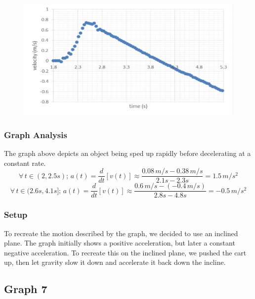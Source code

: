\documentclass[11pt, letterpaper, includehead]{article}
\begin{document}
  \begin{figure}[H] %
    \centering 
    \includegraphics[width=\linewidth]{graph_6.png}
  \end{figure}

  \subsubsection{Graph Analysis}
  The graph above depicts an object being sped up rapidly before decelerating
  at a constant rate.
  $$\forall \, t \in (2, 2.5s); \, a(t) = \frac{d}{dt}[v(t)] \approx \frac{0.08 \, m/s - 0.38 \, m/s}{2.1s - 2.3s} = 1.5 \, m/s^2$$
  $$\forall \, t \in (2.6s, 4.1s]; \, a(t) = \frac{d}{dt}[v(t)] \approx \frac{0.6 \, m/s -(-0.4 \, m/s)}{2.8s - 4.8s} = -0.5 \, m/s^2$$ 
  \subsubsection{Setup}
  To recreate the motion described by the graph, we decided to use an inclined plane.
  The graph initially shows a positive acceleration, but later a constant negative acceleration.
  To recreate this on the inclined plane, we pushed the cart up, then let
  gravity slow it down and accelerate it back down the incline.


  \subsection{Graph 7}
\end{document}
